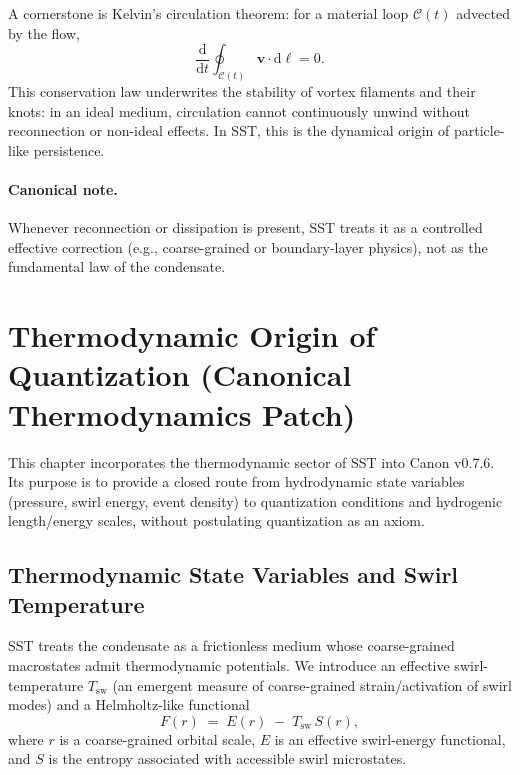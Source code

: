 \documentclass[10pt]{article}
\begin{document}
        A cornerstone is Kelvin's circulation theorem: for a material loop $\mathcal{C}(t)$
        advected by the flow,
        \begin{equation}
            \frac{\mathrm{d}}{\mathrm{d}t}\oint_{\mathcal{C}(t)} \mathbf{v}\cdot \mathrm{d}\boldsymbol{\ell} = 0.
        \end{equation}
        This conservation law underwrites the stability of vortex filaments and their knots:
        in an ideal medium, circulation cannot continuously unwind without reconnection or
        non-ideal effects. In SST, this is the dynamical origin of particle-like persistence.

        \paragraph{Canonical note.}
            Whenever reconnection or dissipation is present, SST treats it as a controlled
            effective correction (e.g., coarse-grained or boundary-layer physics), not as the
            fundamental law of the condensate.

    \section{Thermodynamic Origin of Quantization (Canonical Thermodynamics Patch)}
    \label{sec:thermo_quant}

This chapter incorporates the thermodynamic sector of SST into Canon v0.7.6.
Its purpose is to provide a closed route from hydrodynamic state variables
(pressure, swirl energy, event density) to quantization conditions and
hydrogenic length/energy scales, without postulating quantization as an axiom.

\subsection{Thermodynamic State Variables and Swirl Temperature}

SST treats the condensate as a frictionless medium whose coarse-grained
macrostates admit thermodynamic potentials. We introduce an effective
swirl-temperature $T_{\mathrm{sw}}$ (an emergent measure of coarse-grained
strain/activation of swirl modes) and a Helmholtz-like functional
\begin{equation}
    F(r) \;=\; E(r) \;-\; T_{\mathrm{sw}}\,S(r),
\end{equation}
where $r$ is a coarse-grained orbital scale, $E$ is an effective swirl-energy
functional, and $S$ is the entropy associated with accessible swirl microstates.
\end{document}
